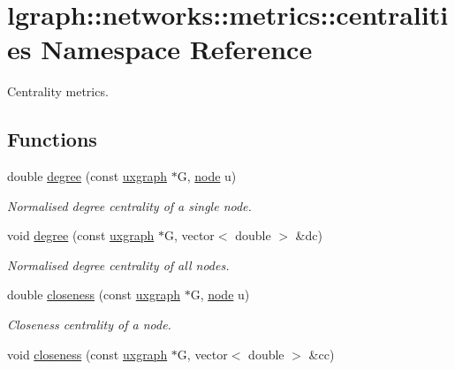 \hypertarget{namespacelgraph_1_1networks_1_1metrics_1_1centralities}{}\section{lgraph\+:\+:networks\+:\+:metrics\+:\+:centralities Namespace Reference}
\label{namespacelgraph_1_1networks_1_1metrics_1_1centralities}


Centrality metrics.  


\subsection*{Functions}
\begin{DoxyCompactItemize}
\item 
double \hyperlink{namespacelgraph_1_1networks_1_1metrics_1_1centralities_a059db418660d28d673a154ceef293469}{degree} (const \hyperlink{classlgraph_1_1utils_1_1uxgraph}{uxgraph} $\ast$G, \hyperlink{namespacelgraph_1_1utils_a7bd66ede3805ef121bc2835bd48de0cf}{node} u)
\begin{DoxyCompactList}\small\item\em Normalised degree centrality of a single node. \end{DoxyCompactList}\item 
void \hyperlink{namespacelgraph_1_1networks_1_1metrics_1_1centralities_abd975d6e07c32b07b48b1501dc8215a1}{degree} (const \hyperlink{classlgraph_1_1utils_1_1uxgraph}{uxgraph} $\ast$G, vector$<$ double $>$ \&dc)
\begin{DoxyCompactList}\small\item\em Normalised degree centrality of all nodes. \end{DoxyCompactList}\item 
double \hyperlink{namespacelgraph_1_1networks_1_1metrics_1_1centralities_a5e567539ccb6396bfb47ba2173a0cc4c}{closeness} (const \hyperlink{classlgraph_1_1utils_1_1uxgraph}{uxgraph} $\ast$G, \hyperlink{namespacelgraph_1_1utils_a7bd66ede3805ef121bc2835bd48de0cf}{node} u)
\begin{DoxyCompactList}\small\item\em Closeness centrality of a node. \end{DoxyCompactList}\item 
void \hyperlink{namespacelgraph_1_1networks_1_1metrics_1_1centralities_aec116343b65bf300d2d820021e020374}{closeness} (const \hyperlink{classlgraph_1_1utils_1_1uxgraph}{uxgraph} $\ast$G, vector$<$ double $>$ \&cc)

\end{DoxyCompactItemize}
